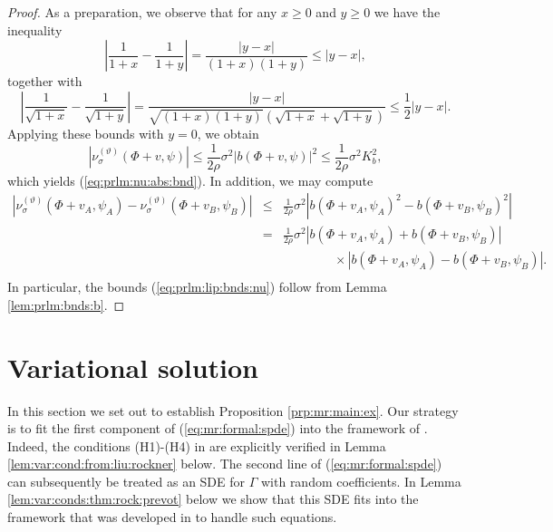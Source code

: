 \documentclass[10pt]{articleHJ}
\newcommand{\abs}[1]{\left\vert#1\right\vert}			%
\newcommand{\sref}[1]{(\ref{#1})}                       %
\numberwithin{equation}{section}
\begin{document}
\begin{proof}
As a preparation, we observe that
for any $x \ge 0$ and $y \ge 0$
we have the inequality
\begin{equation}
\abs{\frac{1}{1 + x} - \frac{1}{1+y}}
 = \frac{\abs{y - x} } {(1 + x)(1+y)}
 \le \abs{y-x} ,
\end{equation}
together with
\begin{equation}
\abs{\frac{1}{\sqrt{1 + x}}
  - \frac{1}{\sqrt{1+y}}}
 = \frac{\abs{y - x} }
   {\sqrt{(1 + x)(1+y)}(\sqrt{1 + x} + \sqrt{1 + y})}
 \le \frac{1}{2}\abs{y-x}.
\end{equation}
Applying these bounds with $y = 0$,
we obtain
\begin{equation}
\abs{\nu^{(\vartheta)}_{\sigma}(\Phi + v, \psi) }
 \le \frac{1}{2 \rho} \sigma^2 \abs{ b(\Phi + v, \psi)}^2
\le \frac{1}{2 \rho} \sigma^2 K_b^2,
\end{equation}
which yields \sref{eq:prlm:nu:abs:bnd}.
In addition,
we may compute
\begin{equation}
\begin{array}{lcl}
\abs{
  \nu^{(\vartheta)}_{\sigma} ( \Phi + v_A, \psi_A)
    - \nu^{(\vartheta)}_{\sigma} ( \Phi + v_B, \psi_B)
}
& \le &
  \frac{1}{2 \rho} \sigma^2
\abs{
  b(\Phi + v_A, \psi_A)^2 - b(\Phi + v_B, \psi_B)^2
}
\\[0.2cm]
& = & \frac{1}{2 \rho} \sigma^2
   \abs{b(\Phi + v_A, \psi_A) + b(\Phi + v_B, \psi_B) }
\\[0.2cm]
& & \qquad \qquad \times
       \abs{b(\Phi + v_A, \psi_A) - b(\Phi + v_B, \psi_B) }.
\\[0.2cm]
\end{array}
\end{equation}
In particular,
the bounds \sref{eq:prlm:lip:bnds:nu}
follow from Lemma \ref{lem:prlm:bnds:b}.
\end{proof}







\section{Variational solution}
\label{sec:var}

In this section we set out to establish
Proposition \ref{prp:mr:main:ex}.
Our strategy is to fit the
first component of \sref{eq:mr:formal:spde}
into the framework of \cite{LiuRockner}.
Indeed, the conditions (H1)-(H4) in \cite{LiuRockner} 
are explicitly verified in Lemma \ref{lem:var:cond:from:liu:rockner} below.
The second line of \sref{eq:mr:formal:spde} can subsequently be treated
as an SDE for $\Gamma$ with random coefficients.
In Lemma \ref{lem:var:conds:thm:rock:prevot} below we
show that this SDE fits into the framework that was developed in
\cite[Chapter 3]{Concise} to handle such equations.
\end{document}
